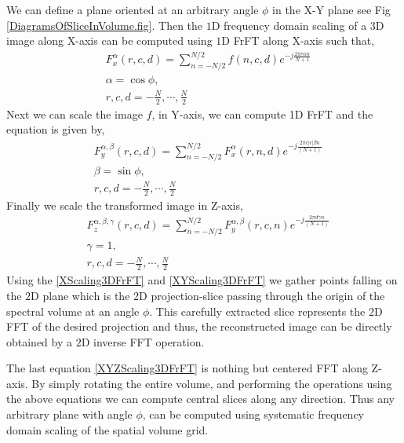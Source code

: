 \documentclass{UCF_ETD}
\begin{document}
We can define a plane oriented at an arbitrary angle $\phi$ in the X-Y plane see Fig \ref{DiagramsOfSliceInVolume.fig}. 
Then the $1$D frequency domain scaling of a $3$D image along X-axis can be computed using $1$D FrFT along X-axis such that,
\begin{eqnarray} \label{XScaling3DFrFT}
& F_x^{\alpha} (r,c,d) = \sum\limits_{n=-N/2}^{N/2} f(n,c,d) e^{-j\frac{2\pi r\alpha n}{N+1}} \nonumber \\
& \alpha = \cos \phi, \nonumber \\
& r,c,d = -\frac{N}{2},\cdots, \frac{N}{2}  
\end{eqnarray}
\indent Next we can scale the image $f$, in Y-axis, we can compute 1D FrFT and the equation is given by,
\begin{eqnarray} \label{XYScaling3DFrFT}
& F_y^{\alpha, \beta }(r,c,d) = \sum\limits_{n=-N/2}^{N/2}F_x^{\alpha} (r,n,d) e^{-j\frac{2\pi c |c| \beta n}{(N+1)}}\nonumber \\
& \beta = \sin \phi, \nonumber \\
& r,c,d = -\frac{N}{2},\cdots, \frac{N}{2} 
\end{eqnarray}
Finally we scale the transformed image in Z-axis,
\begin{eqnarray} \label{XYZScaling3DFrFT}
& F_z^{\alpha, \beta, \gamma }(r,c,d) = \sum\limits_{n=-N/2}^{N/2}F_y^{\alpha, \beta } (r,c,n) e^{-j\frac{2\pi d \gamma n}{(N+1)}}\nonumber \\
& \gamma = 1, \nonumber \\
& r,c,d = -\frac{N}{2},\cdots, \frac{N}{2}
\end{eqnarray}
Using the \eqref{XScaling3DFrFT} and \eqref{XYScaling3DFrFT} we gather points falling on the $2$D plane which is the $2$D projection-slice passing
through the origin of the spectral volume at an angle $\phi$.
This carefully extracted slice represents the $2$D FFT of the desired projection
and thus, the reconstructed image can be directly obtained
by a $2$D inverse FFT operation. 

The last equation \eqref{XYZScaling3DFrFT} is nothing but centered FFT along Z-axis. By simply rotating the entire volume, and performing the operations using the above equations we can compute central slices along any direction. Thus any arbitrary plane with angle $\phi$, can be computed using systematic frequency domain scaling of the spatial volume grid. 
\end{document}

